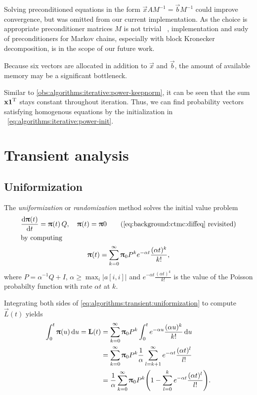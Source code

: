 Solving preconditioned equations in the form
$\vec{x} A M^{-1} = \vec{b} M^{-1}$ could improve convergence, but was
omitted from our current implementation. As the choice is appropriate
preconditioner matrices $M$ is not trivial%
~\citep{DBLP:journals/informs/LangvilleS04}, implementation and sudy
of preconditioners for Markov chains, especially with block Kronecker
decomposition, is in the scope of our future work.

Because six vectors are allocated in addition to $\vec{x}$ and
$\vec{b}$, the amount of available memory may be a significant
bottleneck. 

Similar to \vref{obs:algorithms:iterative:power-keepnorm}, it can be
seen that the sum $\bm{\mathrm{x}} \bm{\mathrm{1}}^{\mathrm{T}}$ stays constant throughout
 iteration. Thus, we can find probability vectors
satisfying homogenous equations by the initialization in%
~\vref{eq:algorithms:iterative:power-init}.

\section{Transient analysis}

\subsection{Uniformization}

The \emph{uniformization} or \emph{randomization} method solves the
initial value problem
\begin{gather}
  \frac{\dd \vec{\uppi}(t)}{\dd t} = \vec{\uppi}(t) \, Q, \quad
  \vec{\uppi}(t) = \vec{\uppi}{0}
  \tag{\ref{eq:background:ctmc:diffeq}~revisited}\\
  \shortintertext{by computing}
  \vec{\uppi}(t) = \sum_{k = 0}^{\infty} \vec{\uppi}_0 P^k e^{-\alpha
    t} \frac{(\alpha t)^k}{k!}\text,
  \label{eq:algorithms:transient:uniformization}
\end{gather}
where $P = \alpha^{-1} Q + I$,
$\alpha \ge \max_{i} \lvert a[i, i] \rvert$ and
$e^{-\alpha t} \frac{(\alpha t)^k}{k!}$ is the value of the Poisson
probabilty function with rate $\alpha t$ at $k$.

Integrating both sides of
\vref{eq:algorithms:transient:uniformization} to compute $\vec{L}(t)$
yields~\citep{reibman1989markov}
\begin{align}
  \int_{0}^t \vec{\uppi}(u) \,\dd u = \vec{L}(t)
  &= \sum_{k = 0}^{\infty} \vec{\uppi}_0 P^k \int_{0}^{t} e^{-\alpha
    u} \frac{(\alpha u)^k}{k!} \,\dd u \\
  &= \sum_{k = 0}^{\infty} \vec{\uppi}_0 P^k \frac{1}{\alpha} \sum_{l
    = k + 1}^{\infty} e^{-\alpha t} \frac{(\alpha t)^l}{l!} \\
  &= \frac{1}{\alpha} \sum_{k = 0}^{\infty} \vec{\uppi}_0 P^k \mleft(
    1 - \sum_{l = 0}^{k} e^{-\alpha t} \frac{(\alpha t)^l}{l!}
    \mright) \text.
    \label{eq:algorithms:transient:aggregate-uniformization}
\end{align}

